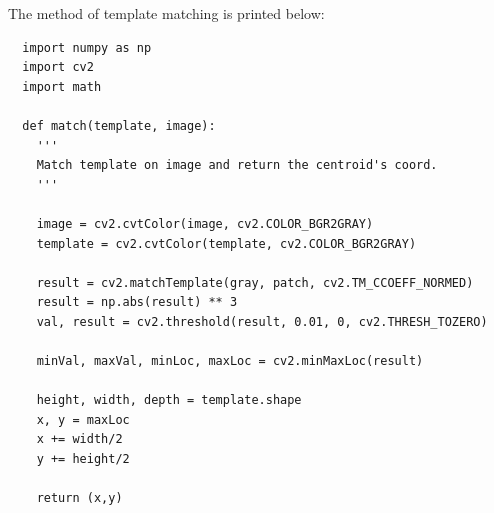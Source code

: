 The method of template matching is printed below:
\begin{verbatim}
  import numpy as np
  import cv2
  import math

  def match(template, image):
    '''
    Match template on image and return the centroid's coord.
    '''

    image = cv2.cvtColor(image, cv2.COLOR_BGR2GRAY)
    template = cv2.cvtColor(template, cv2.COLOR_BGR2GRAY)

    result = cv2.matchTemplate(gray, patch, cv2.TM_CCOEFF_NORMED)
    result = np.abs(result) ** 3
    val, result = cv2.threshold(result, 0.01, 0, cv2.THRESH_TOZERO)

    minVal, maxVal, minLoc, maxLoc = cv2.minMaxLoc(result)

    height, width, depth = template.shape
    x, y = maxLoc
    x += width/2
    y += height/2
      
    return (x,y)
\end{verbatim}


